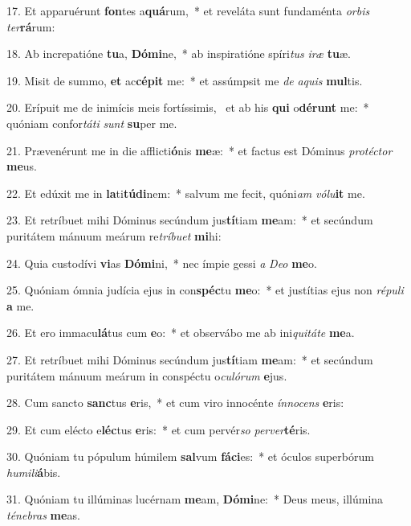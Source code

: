 17. Et apparuérunt \textbf{fon}tes a\textbf{quá}rum,~*  et reveláta sunt fundaménta \textit{or}\textit{bis} \textit{ter}\textbf{rá}rum:\

18. Ab increpatióne \textbf{tu}a, \textbf{Dó}\textbf{mi}ne,~*  ab inspiratióne spíri\textit{tus} \textit{i}\textit{ræ} \textbf{tu}æ.\

19. Misit de summo, \textbf{et} ac\textbf{cé}\textbf{pit} me:~*  et assúmpsit me \textit{de} \textit{a}\textit{quis} \textbf{mul}tis.\

20. Erípuit me de inimícis meis fortíssimis, \dag\  et ab his \textbf{qui} o\textbf{dé}\textbf{runt} me:~*  quóniam confor\textit{tá}\textit{ti} \textit{sunt} \textbf{su}per me.\

21. Prævenérunt me in die afflicti\textbf{ó}nis \textbf{me}æ:~*  et factus est Dóminus \textit{pro}\textit{téc}\textit{tor} \textbf{me}us.\

22. Et edúxit me in \textbf{la}ti\textbf{tú}\textbf{di}nem:~*  salvum me fecit, quóni\textit{am} \textit{vó}\textit{lu}\textbf{it} me.\

23. Et retríbuet mihi Dóminus secúndum jus\textbf{tí}tiam \textbf{me}am:~*  et secúndum puritátem mánuum meárum re\textit{trí}\textit{bu}\textit{et} \textbf{mi}hi:\

24. Quia custodívi \textbf{vi}as \textbf{Dó}\textbf{mi}ni,~*  nec ímpie gessi \textit{a} \textit{De}\textit{o} \textbf{me}o.\

25. Quóniam ómnia judícia ejus in con\textbf{spéc}tu \textbf{me}o:~*  et justítias ejus non \textit{ré}\textit{pu}\textit{li} \textbf{a} me.\

26. Et ero immacu\textbf{lá}tus cum \textbf{e}o:~*  et observábo me ab ini\textit{qui}\textit{tá}\textit{te} \textbf{me}a.\

27. Et retríbuet mihi Dóminus secúndum jus\textbf{tí}tiam \textbf{me}am:~*  et secúndum puritátem mánuum meárum in conspéctu o\textit{cu}\textit{ló}\textit{rum} \textbf{e}jus.\

28. Cum sancto \textbf{sanc}tus \textbf{e}ris,~*  et cum viro innocénte \textit{ín}\textit{no}\textit{cens} \textbf{e}ris:\

29. Et cum elécto e\textbf{léc}tus \textbf{e}ris:~*  et cum pervér\textit{so} \textit{per}\textit{ver}\textbf{té}ris.\

30. Quóniam tu pópulum húmilem \textbf{sal}vum \textbf{fá}\textbf{ci}es:~*  et óculos superbórum \textit{hu}\textit{mi}\textit{li}\textbf{á}bis.\

31. Quóniam tu illúminas lucérnam \textbf{me}am, \textbf{Dó}\textbf{mi}ne:~*  Deus meus, illúmina \textit{té}\textit{ne}\textit{bras} \textbf{me}as.\

